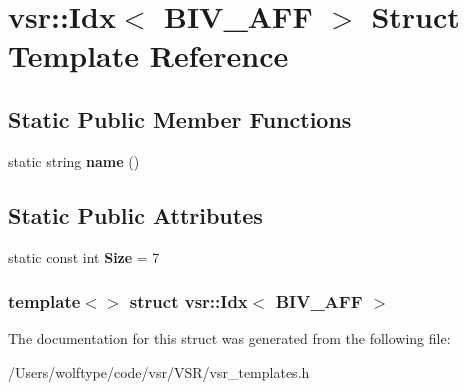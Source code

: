 \hypertarget{structvsr_1_1_idx_3_01_b_i_v___a_f_f_01_4}{\section{vsr\-:\-:Idx$<$ B\-I\-V\-\_\-\-A\-F\-F $>$ Struct Template Reference}
\label{structvsr_1_1_idx_3_01_b_i_v___a_f_f_01_4}
}
\subsection*{Static Public Member Functions}
\begin{DoxyCompactItemize}
\item 
\hypertarget{structvsr_1_1_idx_3_01_b_i_v___a_f_f_01_4_a4b61babd029da1414069d4028a9da44c}{static string {\bfseries name} ()}\label{structvsr_1_1_idx_3_01_b_i_v___a_f_f_01_4_a4b61babd029da1414069d4028a9da44c}

\end{DoxyCompactItemize}
\subsection*{Static Public Attributes}
\begin{DoxyCompactItemize}
\item 
\hypertarget{structvsr_1_1_idx_3_01_b_i_v___a_f_f_01_4_a78f91aefbb72edfcccde6f8310897f98}{static const int {\bfseries Size} = 7}\label{structvsr_1_1_idx_3_01_b_i_v___a_f_f_01_4_a78f91aefbb72edfcccde6f8310897f98}

\end{DoxyCompactItemize}
\subsubsection*{template$<$$>$ struct vsr\-::\-Idx$<$ B\-I\-V\-\_\-\-A\-F\-F $>$}



The documentation for this struct was generated from the following file\-:\begin{DoxyCompactItemize}
\item 
/\-Users/wolftype/code/vsr/\-V\-S\-R/vsr\-\_\-templates.\-h\end{DoxyCompactItemize}

